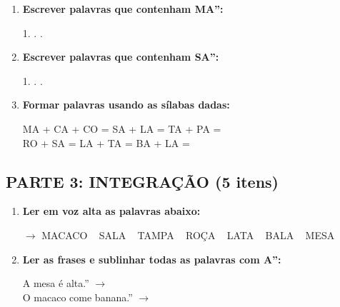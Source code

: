 \begin{exercicio}
\begin{enumerate}[resume]
  \item \textbf{Escrever palavras que contenham MA'':}
  \begin{center}
  1. \underline{\hspace{3cm}} . \underline{\hspace{3cm}} . \underline{\hspace{3cm}}
  \end{center}

  \item \textbf{Escrever palavras que contenham SA'':}
  \begin{center}
  1. \underline{\hspace{3cm}} . \underline{\hspace{3cm}} . \underline{\hspace{3cm}}
  \end{center}

  \item \textbf{Formar palavras usando as sílabas dadas:}
  \begin{center}
  MA + CA + CO = \underline{\hspace{2cm}} \quad SA + LA = \underline{\hspace{2cm}} \quad TA + PA = \underline{\hspace{2cm}} \\
  RO + SA = \underline{\hspace{2cm}} \quad LA + TA = \underline{\hspace{2cm}} \quad BA + LA = \underline{\hspace{2cm}}
  \end{center}
\end{enumerate}

\subsection*{PARTE 3: INTEGRAÇÃO (5 itens)}

\begin{enumerate}[resume]
  \item \textbf{Ler em voz alta as palavras abaixo:}
  \begin{center}
  $\rightarrow$ MACACO  ~  SALA  ~  TAMPA  ~  ROÇA  ~  LATA  ~  BALA  ~  MESA
  \end{center}

  \item \textbf{Ler as frases e sublinhar todas as palavras com A'':}
  \begin{center}
  A mesa é alta.'' $\rightarrow$ \underline{\hspace{5cm}} \\
  O macaco come banana.'' $\rightarrow$ \underline{\hspace{5cm}}
  \end{center}


\end{enumerate}
\end{exercicio}
